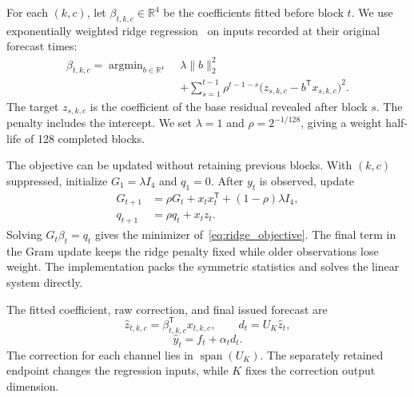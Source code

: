 For each $(k,c)$, let $\beta_{t,k,c}\in\mathbb{R}^4$ be the coefficients fitted before block $t$. We use exponentially weighted ridge regression~\cite{hoerl1970ridge,goel2020rls} on inputs recorded at their original forecast times:
\begin{equation}
 \begin{split}
 \beta_{t,k,c}=\mathop{\arg\min}_{b\in\mathbb{R}^4}\;&
 \lambda\lVert b\rVert_2^2\\
 &+\sum_{s=1}^{t-1}\rho^{t-1-s}
 \bigl(z_{s,k,c}-b^{\mathsf T}x_{s,k,c}\bigr)^2.
 \end{split}
 \label{eq:ridge_objective}
\end{equation}
The target $z_{s,k,c}$ is the coefficient of the base residual revealed after block $s$. The penalty includes the intercept. We set $\lambda=1$ and $\rho=2^{-1/128}$, giving a weight half-life of 128 completed blocks.

The objective can be updated without retaining previous blocks. With $(k,c)$ suppressed, initialize $G_1=\lambda I_4$ and $q_1=0$. After $y_t$ is observed, update
\begin{equation}
 \begin{split}
 G_{t+1}&=\rho G_t+x_t x_t^{\mathsf T}
 +(1-\rho)\lambda I_4,\\
 q_{t+1}&=\rho q_t+x_t z_t.
 \end{split}
 \label{eq:ridge_update}
\end{equation}
Solving $G_t\beta_t=q_t$ gives the minimizer of~\eqref{eq:ridge_objective}. The final term in the Gram update keeps the ridge penalty fixed while older observations lose weight. The implementation packs the symmetric statistics and solves the linear system directly.

The fitted coefficient, raw correction, and final issued forecast are
\begin{equation}
 \widehat z_{t,k,c}=\beta_{t,k,c}^{\mathsf T}x_{t,k,c},
 \qquad d_t=U_K\widehat z_t,
 \label{eq:raw_correction}
\end{equation}
\begin{equation}
 \widehat y_t=f_t+\alpha_t d_t.
 \label{eq:final_forecast}
\end{equation}
The correction for each channel lies in $\operatorname{span}(U_K)$. The separately retained endpoint changes the regression inputs, while $K$ fixes the correction output dimension.

